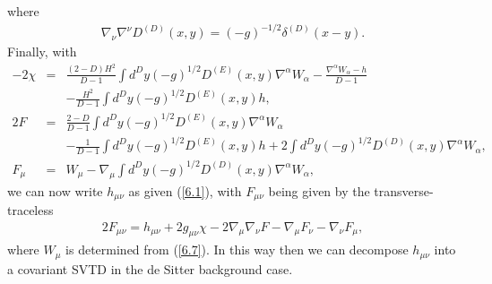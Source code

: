 %
where
%
\begin{eqnarray}
\nabla_{\nu}\nabla^{\nu}D^{(D)}(x,y)=(-g)^{-1/2}\delta^{(D)}(x-y).
\label{6.9}
\end{eqnarray}
%
Finally, with
%
\begin{eqnarray}
-2\chi&=&\frac{(2-D)H^2}{D-1}\int d^Dy(-g)^{1/2}D^{(E)}(x,y)\nabla^{\alpha}W_{\alpha}-\frac{\nabla^{\alpha}W_{\alpha}-h}{D-1}
\nonumber\\
&&-\frac{H^2}{D-1}\int d^Dy(-g)^{1/2}D^{(E)}(x,y)h,
\nonumber\\
2F&=&\frac{2-D}{D-1}\int d^Dy(-g)^{1/2}D^{(E)}(x,y)\nabla^{\alpha}W_{\alpha}
\nonumber\\
&&-\frac{1}{D-1}\int d^Dy(-g)^{1/2}D^{(E)}(x,y)h
+2\int d^Dy(-g)^{1/2}D^{(D)}(x,y)\nabla^{\alpha}W_{\alpha},
\nonumber\\
F_{\mu}&=&W_{\mu}-\nabla_{\mu}\int d^Dy(-g)^{1/2}D^{(D)}(x,y)\nabla^{\alpha}W_{\alpha},
\label{6.10}
\end{eqnarray}
%
we can now write $h_{\mu\nu}$ as given (\ref{6.1}), with $F_{\mu\nu}$ being given by the transverse-traceless
%
\begin{eqnarray}
2F_{\mu\nu}=h_{\mu\nu}+2g_{\mu\nu}\chi-2\nabla_{\mu}\nabla_{\nu}F
- \nabla_{\mu}F_{\nu}-\nabla_{\nu}F_{\mu},
\label{6.11}
\end{eqnarray}
%
where $W_{\mu}$ is determined from (\ref{6.7}). In this way then we can decompose $h_{\mu\nu}$ into a covariant SVTD in the de Sitter background case.

